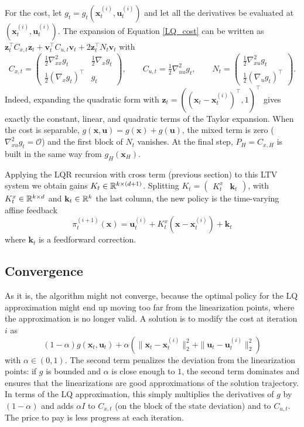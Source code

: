 \documentclass[10pt, a4paper]{report}
\begin{document}
For the cost, let $g_t=g_t(\mathbf x_t^{(i)},\mathbf u_t^{(i)})$ and let all the derivatives be evaluated at $(\mathbf x_t^{(i)},\mathbf u_t^{(i)})$. The expansion of Equation \eqref{LQ_cost} can be written as $\mathbf z_t^\top C_{x,t}\mathbf z_t+\mathbf v_t^\top C_{u,t}\mathbf v_t+2\mathbf z_t^\top N_t\mathbf v_t$ with\begin{equation}
    C_{x,t}=\begin{pmatrix}
        \frac12\nabla_{xx}^2g_t & \frac12\nabla_xg_t\\[0.5ex]
        \frac12(\nabla_xg_t)^\top & g_t
    \end{pmatrix},\qquad 
    C_{u,t}=\tfrac12\nabla_{uu}^2g_t,\qquad 
    N_t=\begin{pmatrix}
        \frac12\nabla_{xu}^2g_t\\[0.5ex]
        \frac12(\nabla_ug_t)^\top
    \end{pmatrix}.
\end{equation}
Indeed, expanding the quadratic form with $\mathbf z_t=((\mathbf x_t-\mathbf x_t^{(i)})^\top,1)^\top$ gives exactly the constant, linear, and quadratic terms of the Taylor expansion. When the cost is separable, $g(\mathbf x,\mathbf u)=g(\mathbf x)+g(\mathbf u)$, the mixed term is zero ($\nabla^2_{xu}g_t=\mathcal O$) and the first block of $N_t$ vanishes. At the final step, $P_H=C_{x,H}$ is built in the same way from $g_H(\mathbf x_H)$.

Applying the LQR recursion with cross term (previous section) to this LTV system we obtain gains $K_t\in{\mathbb R}^{k\times(d+1)}$. Splitting $K_t=\begin{pmatrix}K_t^{x}&\mathbf k_t\end{pmatrix}$, with $K_t^{x}\in{\mathbb R}^{k\times d}$ and $\mathbf k_t\in{\mathbb R}^k$ the last column, the new policy is the time-varying affine feedback\begin{equation}
    \pi^{(i+1)}_t(\mathbf x)=\mathbf u_t^{(i)}+K_t^{x}(\mathbf x-\mathbf x_t^{(i)})+\mathbf k_t
\end{equation}
where $\mathbf k_t$ is a feedforward correction.

\subsection{Convergence}
As it is, the algorithm might not converge, because the optimal policy for the LQ approximation might end up moving too far from the linearization points, where the approximation is no longer valid. A solution is to modify the cost at iteration $i$ as\begin{equation}
    (1-\alpha)g(\mathbf x_t,\mathbf u_t)+\alpha\left(\|\mathbf x_t-\mathbf x_t^{(i)}\|_2^2+\|\mathbf u_t-\mathbf u_t^{(i)}\|_2^2\right)
\end{equation}
with $\alpha\in(0,1)$. The second term penalizes the deviation from the linearization points: if $g$ is bounded and $\alpha$ is close enough to $1$, the second term dominates and ensures that the linearizations are good approximations of the solution trajectory. In terms of the LQ approximation, this simply multiplies the derivatives of $g$ by $(1-\alpha)$ and adds $\alpha I$ to $C_{x,t}$ (on the block of the state deviation) and to $C_{u,t}$. The price to pay is less progress at each iteration.
\end{document}
